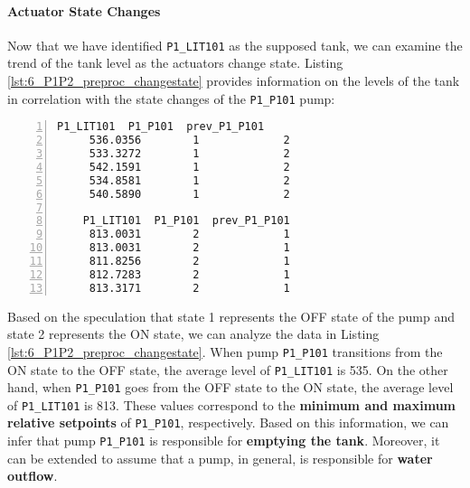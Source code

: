 		
		

\paragraph{Actuator State Changes}
\label{par:6_preproc_P1P2_actuator_state_changes}
Now that we have identified \texttt{P1\_LIT101} as the supposed tank, we can examine the trend of the tank level as the actuators change state. Listing \ref{lst:6_P1P2_preproc_changestate} provides information on the levels of the tank in correlation with the state changes of the \texttt{P1\_P101} pump:

\begin{lstlisting}[language=bash, numbers=left, caption=P1\_P101 state changes in relation to P1\_LIT101, label=lst:6_P1P2_preproc_changestate]
	P1_LIT101  P1_P101  prev_P1_P101
	 536.0356        1             2
	 533.3272        1             2
	 542.1591        1             2
	 534.8581        1             2
	 540.5890        1             2
	
	P1_LIT101  P1_P101  prev_P1_P101
	 813.0031        2             1
	 813.0031        2             1
	 811.8256        2             1
	 812.7283        2             1
	 813.3171        2             1
\end{lstlisting}

Based on the speculation that state 1 represents the OFF state of the pump and state 2 represents the ON state, we can analyze the data in Listing \ref{lst:6_P1P2_preproc_changestate}. When pump \texttt{P1\_P101} transitions from the ON state to the OFF state, the average level of \texttt{P1\_LIT101} is 535. On the other hand, when \texttt{P1\_P101} goes from the OFF state to the ON state, the average level of \texttt{P1\_LIT101} is 813. These values correspond to the \textbf{minimum and maximum relative setpoints} of \texttt{P1\_P101}, respectively. \newline
Based on this information, we can infer that pump \texttt{P1\_P101} is responsible for \textbf{emptying the tank}. Moreover, it can be extended to assume that a pump, in general, is responsible for \textbf{water outflow}.


